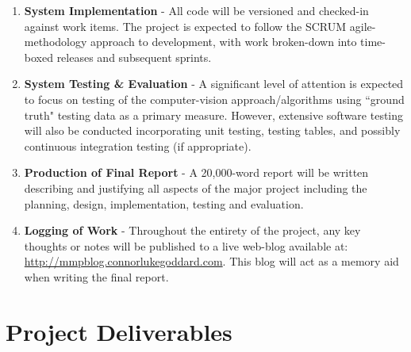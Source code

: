 \documentclass[10pt,fleqn,twoside]{article}
\begin{document}
\begin{enumerate}
	\item \textbf{System Implementation} - All code will be versioned and checked-in against work items. The project is expected to follow the SCRUM agile-methodology approach to development, with work broken-down into time-boxed releases and subsequent sprints. 
	
	\item \textbf{System Testing \& Evaluation} - A significant level of attention is expected to focus on testing of the computer-vision approach/algorithms using ``ground truth" testing data as a primary measure. However, extensive software testing will also be conducted incorporating unit testing, testing tables, and possibly continuous integration testing (if appropriate).
	
	\item \textbf{Production of Final Report} - A 20,000-word report will be written describing and justifying all aspects of the major project including the planning, design, implementation, testing and evaluation.
	
	\item \textbf{Logging of Work} - Throughout the entirety of the project, any key thoughts or notes will be published to a live web-blog available at: \url{http://mmpblog.connorlukegoddard.com}. This blog will act as a memory aid when writing the final report.

\end{enumerate}


\section{Project Deliverables}
\end{document}

